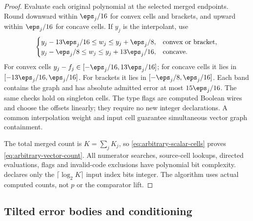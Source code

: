 \begin{proof}
Evaluate each original polynomial at the selected merged endpoints.
Round downward within $\eps_j/16$ for convex cells and brackets,
and upward within $\eps_j/16$ for concave cells. If $y_j$ is the
interpolant, use
\begin{equation}\label{eq:signed-overlay-bands}
 \begin{cases}
 y_j-13\eps_j/16\le w_j\le y_j+\eps_j/8,
       &\text{convex or bracket},\\
 y_j-\eps_j/8\le w_j\le y_j+13\eps_j/16,
       &\text{concave}.
 \end{cases}
\end{equation}
For convex cells $y_j-f_j\in[-\eps_j/16,13\eps_j/16]$;
for concave cells it lies in $[-13\eps_j/16,\eps_j/16]$.
For brackets it lies in $[-\eps_j/8,\eps_j/16]$.
Each band contains the graph and has absolute admitted error at most
$15\eps_j/16$. The same checks hold on singleton cells. The type
flags are computed Boolean wires and choose the offsets linearly;
they require no new integer declarations. A common interpolation weight
and input cell guarantee simultaneous vector graph containment.

The total merged count is $K=\sum_jK_j$, so
\eqref{eq:arbitrary-scalar-cells} proves
\eqref{eq:arbitrary-vector-count}. All numerator searches, source-cell
lookups, directed evaluations, flags and invalid-code exclusions have
polynomial bit complexity.  declares only
the $\lceil\log_2K\rceil$ input index bits integer. The algorithm
uses actual computed counts, not $p$ or the comparator lift.
\end{proof}

\subsection{Tilted error bodies and conditioning}

